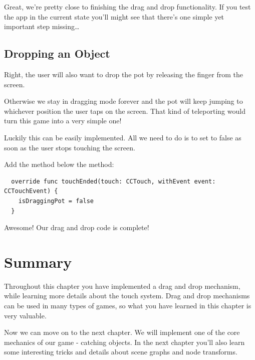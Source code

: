 Great, we're pretty close to finishing the drag and drop functionality. If you
test the app in the current state you'll might see that there's one simple yet
important step missing\ldots

\subsection{Dropping an Object}
Right, the user will also want to drop the pot by releasing the finger from the
screen. 

Otherwise we stay in dragging mode forever and the pot will keep jumping
to whichever position the user taps on the screen. That kind of teleporting
would turn this game into a very simple one!

Luckily this can be easily implemented. All we need to do is to set
 to false as soon as the user stops touching the
screen.
\begin{leftbar}
Add the  method below the  method:
\begin{lstlisting}
  override func touchEnded(touch: CCTouch, withEvent event: CCTouchEvent) {
    isDraggingPot = false
  }
\end{lstlisting}
\end{leftbar}
Awesome! Our drag and drop code is complete! 

\section{Summary} 
Throughout this chapter you have implemented a drag and drop mechanism, while
learning more details about the \cocos{} touch system. Drag and drop mechanisms
can be used in many types of games, so what you have learned in this chapter is very valuable.

Now we can move on to the next chapter. We will implement one of the core
mechanics of our game - catching objects. In the next chapter you'll also learn
some interesting tricks and details about scene graphs and node transforms.